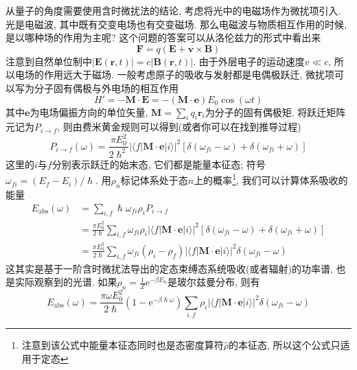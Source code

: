     从量子的角度需要使用含时微扰法的结论, 考虑将光中的电磁场作为微扰项引入. 
    光是电磁波, 其中既有交变电场也有交变磁场. 那么电磁波与物质相互作用的时候, 是以哪种场的作用为主呢? 
    这个问题的答案可以从洛伦兹力的形式中看出来
    \begin{equation}
        \bm{F} = q (\bm{E} + \bm{v} \times \bm{B})
    \end{equation}
    注意到自然单位制中$|\bm{E}(\bm r,t)| = c|\bm{B}(\bm r,t)|$. 由于外层电子的运动速度$v \ll c$, 所以电场的作用远大于磁场. 一般考虑原子的吸收与发射都是电偶极跃迁, 微扰项可以写为分子固有偶极与外电场的相互作用
    \begin{equation}
        H' = - \bm{M} \cdot \bm{E} = - (\bm{M} \cdot \bm{e}) E_0 \cos(\omega t)
    \end{equation}
    其中$\bm{e}$为电场偏振方向的单位矢量, $\bm{M} = \sum_i q_i \bm{r}_i$为分子的固有偶极矩. 将跃迁矩阵元记为$P_{i\to f}$, 则由费米黄金规则可以得到(或者你可以在\cite{蒋鸿中物化:含时微扰}找到推导过程)
    \begin{equation}
        P_{i\to f}(\omega) = \frac{\pi E_0^2}{2\hslash^2} \left| \langle f|\bm{M} \cdot \bm{e}|i \rangle \right|^2 \left[ \delta(\omega_{fi} - \omega) + \delta(\omega_{fi} + \omega) \right]
    \end{equation}
    这里的$i$与$f$分别表示跃迁的始末态, 它们都是能量本征态; 符号$\omega_{fi} = (E_f - E_i)/\hslash$. 用$\rho_n$标记体系处于态$n$上的概率\footnote{注意到该公式中能量本征态同时也是态密度算符$\hat\rho$的本征态, 所以这个公式只适用于定态}, 我们可以计算体系吸收的能量
    \begin{equation}\begin{aligned}
        E_\mathrm{abs}(\omega) 
        &= \sum_{i,f}  \hslash\omega_{fi} \rho_i P_{i\to f} \\
        &= \frac{\pi E_0^2}{2\hslash} \sum_{i,f} \omega_{fi} \rho_i \left| \langle f|\bm{M} \cdot \bm{e}|i \rangle \right|^2 \left[ \delta(\omega_{fi} - \omega) + \delta(\omega_{fi} + \omega) \right] \\
        &= \frac{\pi E_0^2}{2\hslash} \sum_{i,f} \omega_{fi} (\rho_i - \rho_f) \left| \langle f|\bm{M} \cdot \bm{e}|i \rangle \right|^2 \delta(\omega_{fi} - \omega)
    \end{aligned}\end{equation}
    这其实是基于一阶含时微扰法导出的定态束缚态系统吸收(或者辐射)的功率谱, 也是实际观察到的光谱. 如果$\rho_n = \frac 1Z \mathrm{e}^{-\beta E_n}$是玻尔兹曼分布, 则有
    \begin{equation}
        E_\mathrm{abs}(\omega) = \frac{\pi \omega E_0^2}{2\hslash} (1 - \mathrm{e}^{-\beta\hslash\omega}) \sum_{i,f} \rho_i \left| \langle f|\bm{M} \cdot \bm{e}|i \rangle \right|^2 \delta(\omega_{fi} - \omega)
    \end{equation}

